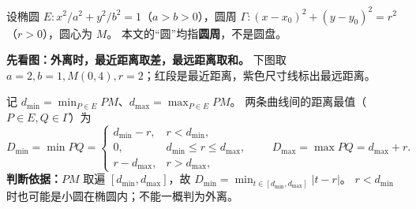 \begin{statementbox}
设椭圆 $E:x^2/a^2+y^2/b^2=1$（$a>b>0$），圆周
$\Gamma:(x-x_0)^2+(y-y_0)^2=r^2$（$r>0$），圆心为 $M$。
本文的“圆”均指\textbf{圆周}，不是圆盘。

\textbf{先看图：外离时，最近距离取差，最远距离取和。}
下图取 $a=2,b=1,M(0,4),r=2$；红段是最近距离，紫色尺寸线标出最远距离。


记 $d_{\min}=\min_{P\in E}PM$、$d_{\max}=\max_{P\in E}PM$。
两条曲线间的距离最值（$P\in E,Q\in\Gamma$）为
\[
 D_{\min}=\min PQ=
 \begin{cases}
 d_{\min}-r,&r<d_{\min},\\
 0,&d_{\min}\le r\le d_{\max},\\
 r-d_{\max},&r>d_{\max},
 \end{cases}
 \qquad D_{\max}=\max PQ=d_{\max}+r.
\]
\textbf{判断依据：}$PM$ 取遍 $[d_{\min},d_{\max}]$，故
$D_{\min}=\min_{t\in[d_{\min},d_{\max}]}|t-r|$。
$r<d_{\min}$ 时也可能是小圆在椭圆内；不能一概判为外离。
\end{statementbox}
